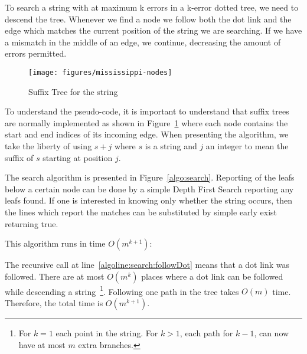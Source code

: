 To search a string with at maximum k errors in a k-error dotted tree, we need to descend the tree. Whenever we find a node we follow both the dot link and the edge which matches the current position of the string we are searching. If we have a mismatch in the middle of an edge, we continue, decreasing the amount of errors permitted.

\begin{figure}
\texttt{[image: figures/mississippi-nodes]}
\caption{Suffix Tree for the string }%
\label{fig:mississippi-nodes}
\end{figure}

To understand the pseudo-code, it is important to understand that suffix trees are normally implemented as shown in Figure~\ref{fig:mississippi-nodes} where each node contains the start and end indices of its incoming edge. When presenting the algorithm, we take the liberty of using $s+j$ where $s$ is a string and $j$ an integer to mean the suffix of $s$ starting at position $j$.



The search algorithm is presented in Figure~\ref{algo:search}. Reporting of the leafs below a certain node can be done by a simple Depth First Search reporting any leafs found. If one is interested in knowing only whether the string occurs, then the lines which report the matches can be substituted by simple early exist returning true.

This algorithm runs in time $O(m^{k+1})$:

The recursive call at line~\ref{algoline:search:followDot} means that a dot link was followed. There are at most $O(m^k)$ places where a dot link can be followed while descending a string~\footnote{For $k=1$ each point in the string. For $k>1$, each path for $k-1$, can now have at most $m$ extra branches.}. Following one path in the tree takes $O(m)$ time. Therefore, the total time is $O(m^{k+1})$.
